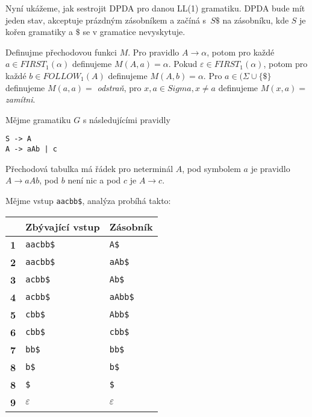 Nyní ukážeme, jak sestrojit DPDA pro danou LL(1) gramatiku.
DPDA bude mít jeden stav, akceptuje prázdným zásobníkem
a začíná s~$S\$$ na zásobníku, kde $S$ je kořen
gramatiky a $\$$ se v gramatice nevyskytuje.

Definujme přechodovou funkci $M$.
Pro pravidlo $A \to \alpha$, potom pro každé $a \in FIRST_1(\alpha)$
definujeme $M(A, a) = \alpha$. Pokud $\varepsilon \in FIRST_1(\alpha)$,
potom pro každé $b \in FOLLOW_1(A)$ definujeme $M(A,b) = \alpha$.
Pro $a \in (\Sigma \cup \{ \$ \}$ definujeme $M(a,a) =$ {\em odstraň},
pro $x, a \in Sigma, x \neq a$ definujeme $M(x, a) =$ {\em zamítni}.


\begin{example}
Mějme gramatiku $G$ s následujícími pravidly
\begin{verbatim}
S -> A
A -> aAb | c
\end{verbatim}
Přechodová tabulka má řádek pro neterminál $A$,
pod symbolem $a$ je pravidlo $A \to aAb$, pod $b$ není nic a pod $c$ je
$A \to c$.

\pagebreak

Mějme vstup \verb|aacbb$|, analýza probíhá takto:

\medskip
\centering
\begin{tabular}{|l|l|l|}
\hline
           & \textbf{Zbývající vstup} & \textbf{Zásobník}    \\ \hline
\textbf{1} & \verb|aacbb$|                  & \verb|A$|      \\ \hline
\textbf{2} & \verb|aacbb$|                  & \verb|aAb$|    \\ \hline
\textbf{3} & \verb|acbb$|                   & \verb|Ab$|     \\ \hline
\textbf{4} & \verb|acbb$|                   & \verb|aAbb$|   \\ \hline
\textbf{5} & \verb|cbb$|                    & \verb|Abb$|    \\ \hline
\textbf{6} & \verb|cbb$|                    & \verb|cbb$|    \\ \hline
\textbf{7} & \verb|bb$|                     & \verb|bb$|     \\ \hline
\textbf{8} & \verb|b$|                      & \verb|b$|      \\ \hline
\textbf{8} & \verb|$|                       & \verb|$|       \\ \hline
\textbf{9} & $\varepsilon$                              & $\varepsilon$          \\ \hline
\end{tabular}
\end{example}

